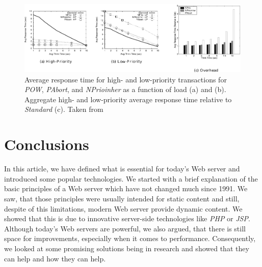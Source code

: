 \documentclass[
  a4paper,               %
  twoside,               %
  headings=small,        %
  DIV=12,                %
  BCOR=1cm,              %
  headinclude=true,      %
  footinclude=true,      %
  numbers=noenddot,      %
  11pt]{scrartcl}        %
\begin{document}
\begin{figure}[h]
\centerline{\includegraphics[width=15cm]{pics/pow.pdf}}
\caption{Average response time for high- and low-priority transactions for \textit{POW}, \textit{PAbort}, and \textit{NPrioinher} as a function of load (a) and (b). Aggregate high- and low-priority average response time
relative to \textit{Standard} (c). Taken from \cite{McWherter}
}
\label{fig-pow}
\end{figure}

\section{Conclusions}
In this article, we have defined what is essential for today's Web server and introduced some popular technologies. We started with a brief explanation of the basic principles of a Web server which have not changed much since 1991. We saw, that those principles were usually intended for static content and still, despite of this limitations, modern Web server provide dynamic content. We showed that this is due to innovative server-side technologies like \textit{PHP} or \textit{JSP}. Although today's Web servers are powerful, we also argued, that there is still space for improvements, especially when it comes to performance. Consequently, we looked at some promising solutions being in research and showed that they can help and how they can help.




\end{document}

